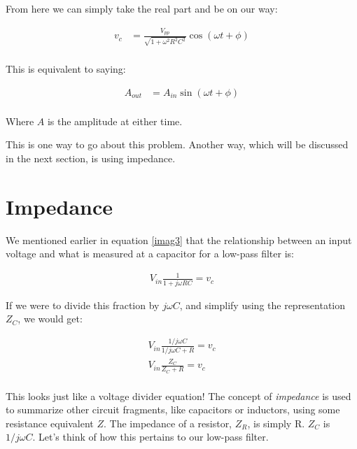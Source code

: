 \documentclass[12pt]{report}
\newcommand{\Vpp}{{ V}_{ pp}}
\newcommand{\Vi}{{V}_{in}}
\begin{document}
From here we can simply take the real part and be on our way:

\begin{equation} \label{imag5}
\begin{split}
v_c &= \frac{\Vpp}{\sqrt{1 + \omega^2 R^2C^2}} \cos(\omega t + \phi) \\
\end{split}
\end{equation}

This is equivalent to saying:

\begin{equation} \label{imag5}
\begin{split}
A_{out} &= A_{in}\sin(\omega t + \phi) \\
\end{split}
\end{equation}

Where $A$ is the amplitude at either time. 

This is one way to go about this problem. Another way, which will be discussed in the next section, is using impedance. 

\section{Impedance}
We mentioned earlier in equation \eqref{imag3} that the relationship between an input voltage and what is measured at a capacitor for a low-pass filter is: 

\begin{equation} \label{imp1}
\begin{split}
\Vi \frac{1}{1+j\omega RC} = v_c
\end{split}
\end{equation}

If we were to divide this fraction by $j\omega C$, and simplify using the representation $Z_C$, we would get: 

\begin{equation} \label{imp2}
\begin{split}
\Vi \frac{1/j\omega C}{1/j\omega C + R} = v_c \\
\Vi \frac{Z_C}{Z_C + R} = v_c \\ 
\end{split}
\end{equation}

This looks just like a voltage divider equation! The concept of \textit{impedance} is used to summarize other circuit fragments, like capacitors or inductors, using some resistance equivalent $Z$. The impedance of a resistor, $Z_R$, is simply R. $Z_C$ is ${1} / j\omega C$. Let's think of how this pertains to our low-pass filter. 
\end{document}
